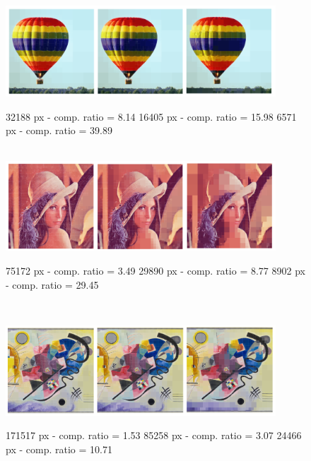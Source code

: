 \documentclass[8pt]{beamer}
\begin{document}
\begin{frame}
\begin{center}
 \begin{figure}[!h]
\includegraphics[width=0.9\textwidth]{./figures/s3_comp_small} \\
\begin{footnotesize}32188 px - comp. ratio = 8.14 \hfill 16405 px - comp. ratio = 15.98 \hfill 6571 px - comp. ratio = 39.89 \end{footnotesize} \\
\includegraphics[width=0.9\textwidth]{./figures/s4_comp_small}\\
\begin{footnotesize}75172 px - comp. ratio = 3.49 \hfill 29890 px - comp. ratio = 8.77 \hfill 8902 px - comp. ratio = 29.45 \end{footnotesize} \\
\end{figure}
\end{center}
\end{frame}

\begin{frame}
\begin{center}
 \begin{figure}[!h]
\includegraphics[width=0.9\textwidth]{./figures/s6_comp_small}\\
\begin{footnotesize}171517 px - comp. ratio = 1.53 \hfill 85258 px - comp. ratio = 3.07 \hfill 24466 px - comp. ratio = 10.71
\end{footnotesize} \\
\end{figure}
\end{center}
\end{frame}
\end{document}
